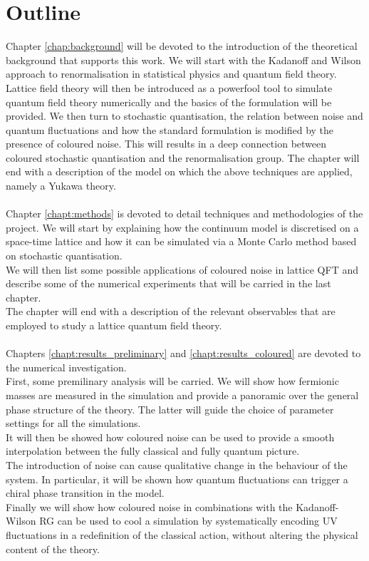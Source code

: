 \section{Outline}
Chapter \ref{chap:background} will be devoted to the introduction of the theoretical background that supports this work. 
We will start with the Kadanoff and Wilson approach to renormalisation in statistical physics and quantum field theory. 
Lattice field theory will then be introduced as a powerfool tool to simulate quantum field theory numerically and the basics of the formulation will be provided. 
We then turn to stochastic quantisation, the relation between noise and quantum fluctuations and how the standard formulation is modified by the presence of coloured noise. 
This will results in a deep connection between coloured stochastic quantisation and the renormalisation group.
The chapter will end with a description of the model on which the above techniques are applied, namely a Yukawa theory. \\~\\
Chapter \ref{chapt:methods} is devoted to detail techniques and methodologies of the project. We will start by explaining how the continuum model is discretised on a space-time lattice and how it can be simulated via a Monte Carlo method based on stochastic quantisation. \\
We will then list some possible applications of coloured noise in lattice QFT and describe some of the numerical experiments that will be carried in the last chapter.\\
The chapter will end with a description of the relevant observables that are employed to study a lattice quantum field theory. \\~\\
Chapters \ref{chapt:results_preliminary} and \ref{chapt:results_coloured} are devoted to the numerical investigation. \\
First, some premilinary analysis will be carried. We will show how fermionic masses are measured in the simulation and provide a panoramic over the general phase structure of the theory. The latter will guide the choice of parameter settings for all the simulations. \\
It will then be showed how coloured noise can be used to provide a smooth interpolation between the fully classical and fully quantum picture. \\
The introduction of noise can cause qualitative change in the behaviour of the system. In particular, it will be shown how quantum fluctuations can trigger a chiral phase transition in the model. \\
Finally we will show how coloured noise in combinations with the Kadanoff-Wilson RG can be used to cool a simulation by systematically encoding UV fluctuations in a redefinition of the classical action, without altering the physical content of the theory.